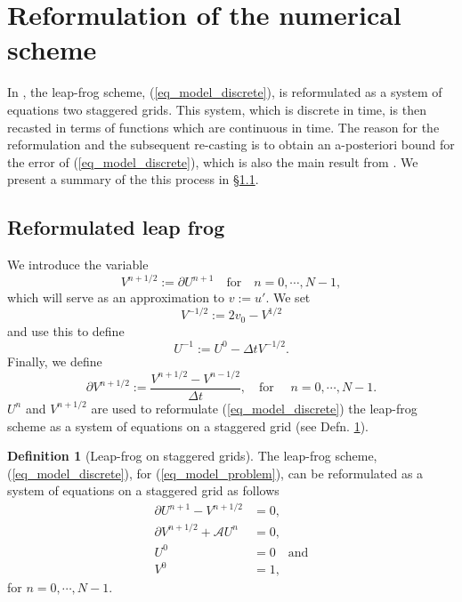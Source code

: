 \documentclass[12pt,a4paper]{article}
\numberwithin{equation}{section}
\theoremstyle{definition}
\newtheorem{Defn}[subsection]{Definition}
\begin{document}
\section{Reformulation of the numerical scheme}\label{sec_reformulation}
In \cite{georgoulis2016posteriori}, the  leap-frog scheme, (\ref{eq_model_discrete}), is reformulated as a system of equations two staggered grids.  This system, which is discrete in time, is then recasted in terms of functions which are continuous in time.  The reason for  the reformulation and the subsequent re-casting is to obtain  an a-posteriori bound for the error of (\ref{eq_model_discrete}), which is also the main result from \cite{georgoulis2016posteriori}.  We present a summary of the this process in  \S \ref{subsec_reform_leapfrog}.
\subsection{Reformulated leap frog}\label{subsec_reform_leapfrog}
We introduce the variable
\begin{equation}
V^{n+1/2}:=\partial U^{n+1} \quad\text{for} \quad n=0,\cdots,N-1,
\end{equation}
which will serve as an approximation to $v:=  u'$. We set 
\begin{equation}
V^{-1/2}:=2v_0-V^{1/2}
\end{equation}
and  use this to define
\begin{equation}
U^{-1} := U^0-\Delta t V^{-1/2}.
\end{equation}
Finally, we define
\begin{equation}
\partial V^{n+1/2}:= \frac{V^{n+1/2}-V^{n-1/2}}{\Delta t}, \quad \text{for } \quad n= 0,\cdots, N-1.
\end{equation}
$U^n$ and $V^{n+1/2}$ are used to reformulate (\ref{eq_model_discrete}) the leap-frog scheme as a system of equations on a staggered grid (see Defn. \ref{defn_staggered_midpoint}).
\begin{Defn}[Leap-frog on staggered grids]\label{defn_staggered_midpoint}
	The leap-frog scheme, (\ref{eq_model_discrete}), for (\ref{eq_model_problem}), can be reformulated as a system of equations on a staggered grid as follows
\begin{equation}\label{eq_harmonic_discretization}
\begin{aligned}
\partial U^{n+1} - V^{n+1/2} &= 0,\\
\partial V^{n+1/2} +\mathcal{A}U^n &= 0,\\
U^0 & =0\quad \text{and}\\
V^0 &=1,
\end{aligned}
\end{equation}
for $n= 0,\cdots, N-1$.
\end{Defn}
\end{document}
